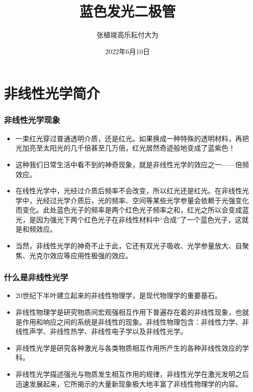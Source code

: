 \documentclass{beamer}
\title{蓝色发光二极管}
\author{
    张植竣\texorpdfstring{\quad}{    }高乐耘\texorpdfstring{\quad}{    }付大为
}
\date{2022年6月10日}
\newenvironment{slide}{
    \begin{frame}{\bfseries{\sectiontitle}}
}{
    \end{frame}
}
\let\sectiononly\section
\renewcommand{\section}[1]{
    \sectiononly{#1}
    \let\sectiontitle\relax
    \newcommand{\sectiontitle}{#1}
}
\begin{document}
\begin{frame}[plain]
    \titlepage
\end{frame}

\part{非线性光学简介}

\begin{frame}
    \partpage
    \tableofcontents
\end{frame}

\section{非线性光学现象}

\begin{slide}
    \begin{itemize}
        \item 一束红光穿过普通透明介质，还是红光。如果换成一种特殊的透明材料，再把光加亮至太阳光的几千倍甚至几万倍，红光居然奇迹般地变成了蓝紫色！

        \item 这种我们日常生活中看不到的神奇现象，就是非线性光学的效应之一——倍频效应。

        \item 在线性光学中，光经过介质后频率不会改变，所以红光还是红光。在非线性光学中，光经过光学介质后，光的频率、空间等某些光学参量会依赖于光强变化而变化。此处蓝色光子的频率是两个红色光子频率之和，红光之所以会变成蓝光，是因为强光下两个红色光子在非线性材料中“合成”了一个蓝色光子，这就是和频效应。

        \item 当然，非线性光学的神奇不止于此，它还有双光子吸收、光学参量放大、自聚焦、光克尔效应等应用性极强的效应。
    \end{itemize}
\end{slide}

\section{什么是非线性光学}

\begin{slide}
    \begin{itemize}
        \item 20世纪下半叶建立起来的非线性物理学，是现代物理学的重要基石。

        \item 非线性物理学是研究物质间宏观强相互作用下普遍存在着的非线性现象，也就是作用和响应之间的系统是非线性的现象。非线性物理包含：非线性力学、非线性声学、非线性热学、非线性电子学以及非线性光学。

        \item 非线性光学是研究各种激光与各类物质相互作用所产生的各种非线性效应的学科。

        \item 非线性光学描述强光与物质发生相互作用的规律，非线性光学在激光发明之后迅速发展起来，它所揭示的大量新现象极大地丰富了非线性物理学的内容。
    \end{itemize}
\end{slide}
\end{document}

